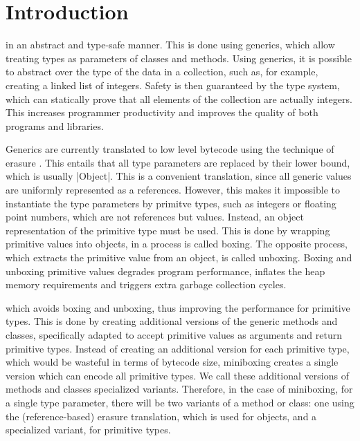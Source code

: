 \section{Introduction}

 in an abstract and type-safe manner. This is done using generics, which allow treating types as parameters of classes and methods. Using generics, it is possible to abstract over the type of the data in a collection, such as, for example, creating a linked list of integers. Safety is then guaranteed by the type system, which can statically prove that all elements of the collection are actually integers. This increases programmer productivity and improves the quality of both programs and libraries.

Generics are currently translated to low level bytecode using the technique of erasure \cite{java-erasure}. This entails that all type parameters are replaced by their lower bound, which is usually |Object|. This is a convenient translation, since all generic values are uniformly represented as a references. However, this makes it impossible to instantiate the type parameters by primitve types, such as integers or floating point numbers, which are not references but values. Instead, an object representation of the primitive type must be used. This is done by wrapping primitive values into objects, in a process is called boxing. The opposite process, which extracts the primitive value from an object, is called unboxing. Boxing and unboxing primitive values degrades program performance, inflates the heap memory requirements and triggers extra garbage collection cycles.

 which avoids boxing and unboxing, thus improving the performance for primitive types. This is done by creating additional versions of the generic methods and classes, specifically adapted to accept primitive values as arguments and return primitive types. Instead of creating an additional version for each primitive type, which would be wasteful in terms of bytecode size, miniboxing creates a single version which can encode all primitive types. We call these additional versions of methods and classes specialized variants. Therefore, in the case of miniboxing, for a single type parameter, there will be two variants of a method or class: one using the (reference-based) erasure translation, which is used for objects, and a specialized variant, for primitive types.

